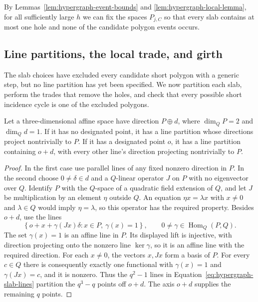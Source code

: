 By Lemmas~\ref{lem:hypergraph-event-bounds} and
\ref{lem:hypergraph-local-lemma}, for all sufficiently large $h$ we
can fix the spaces $P_{j,C}$ so that every slab contains at most one
hole and none of the candidate polygon events occurs.

\subsection{Line partitions, the local trade, and girth}

The slab choices have excluded every candidate short polygon with a
generic step, but no line partition has yet been specified. We now
partition each slab, perform the trades that remove the holes, and
check that every possible short incidence cycle is one of the
excluded polygons.

\begin{lemma}\label{lem:hypergraph-slab-partition}
Let a three-dimensional affine space have direction $P\oplus d$,
where $\dim_QP=2$ and $\dim_Qd=1$.  If it has no designated point,
it has a line partition whose directions project nontrivially to $P$.
If it has a designated point $o$, it has a line partition containing
$o+d$, with every other line's direction projecting nontrivially to $P$.
\end{lemma}

\begin{proof}
In the first case use parallel lines of any fixed nonzero direction
in $P$.  In the second choose $0\ne\delta\in d$ and a $Q$-linear
operator $J$ on $P$ with no eigenvector over $Q$.  Identify $P$ with
the $Q$-space of a quadratic field extension of $Q$, and let $J$ be
multiplication by an element $\eta$ outside $Q$.  An equation
$\eta x=\lambda x$ with $x\ne0$ and $\lambda\in Q$ would imply
$\eta=\lambda$, so this operator has the required property.
Besides $o+d$, use the lines
\begin{equation}\label{eq:hypergraph-slab-lines}
 \left\{o+x+\gamma(Jx)\delta:
                   x\in P,\ \gamma(x)=1\right\},
 \qquad 0\ne\gamma\in\operatorname{Hom}_Q(P,Q).
\end{equation}
The set $\gamma(x)=1$ is an affine line in $P$.  Its displayed lift
is injective, with direction projecting onto the nonzero line
$\ker\gamma$, so it is an affine line with the required direction.
For each $x\ne0$, the vectors $x,Jx$ form a basis of $P$.
For every $c\in Q$ there is consequently exactly one functional
with $\gamma(x)=1$ and $\gamma(Jx)=c$, and it is nonzero.
Thus the $q^2-1$ lines in Equation~\eqref{eq:hypergraph-slab-lines}
partition the $q^3-q$ points off $o+d$.  The axis $o+d$ supplies the
remaining $q$ points.
\end{proof}

